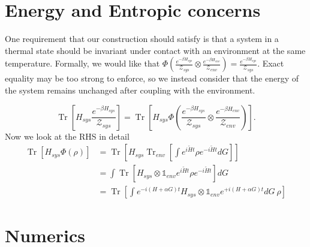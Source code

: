 \documentclass{article}
\newcommand{\parens}[1]{\left( #1 \right)}
\newcommand{\brackets}[1]{\left[ #1 \right]}
\newcommand{\openone}{\mathds{1}}
\DeclareMathOperator{\Tr}{Tr}
\newcommand{\trace}[1]{\Tr \brackets{ #1 }}
\newcommand{\partrace}[2]{\Tr_{#1} \brackets{ #2 }}
\newcommand{\partfun}{\mathcal{Z}}
\begin{document}
\section{Energy and Entropic concerns}
One requirement that our construction should satisfy is that a system in a thermal state should be invariant under contact with an environment at the same temperature. Formally, we would like that $\Phi \parens{\frac{e^{-\beta H_{sys}}}{\partfun_{sys}} \otimes \frac{e^{- \beta H_{env}}}{\partfun_{env}}} = \frac{e^{-\beta H_{sys}}}{\partfun_{sys}}$. Exact equality may be too strong to enforce, so we instead consider that the energy of the system remains unchanged after coupling with the environment. 

\begin{equation}
    \trace{H_{sys} \frac{e^{-\beta H_{sys}}}{\partfun_{sys}}} = \trace{H_{sys} \Phi \parens{\frac{e^{-\beta H_{sys}}}{\partfun_{sys}} \otimes \frac{e^{- \beta H_{env}}}{\partfun_{env}}}}.
\end{equation}
Now we look at the RHS in detail
\begin{align}
    \trace{H_{sys} \Phi \parens{\rho} } &= \trace{ H_{sys} \partrace{env}{\int e^{i \widetilde{H} t} \rho e^{-i \widetilde{H} t} dG}} \\
    &= \int \trace{H_{sys} \otimes \openone_{env} e^{i \widetilde{H} t} \rho e^{-i \widetilde{H} t} } dG \\
    &=  \trace{\int e^{- i (H + \alpha G) t} H_{sys} \otimes \openone_{env} e^{+ i (H + \alpha G) t} dG ~ \rho } 
\end{align}


\section{Numerics}
\end{document}
